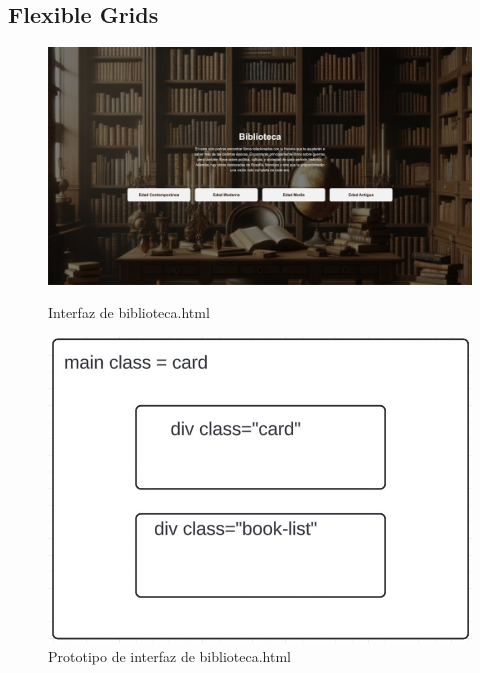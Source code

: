 \documentclass{article}
\begin{document}
\subsection{Flexible Grids}

\begin{figure}[H]
    \centering
    \begin{minipage}{0.49\textwidth}
        \includegraphics[width=\linewidth]{cssFotos/flexibleGrids.jpg}
        \caption{Interfaz de biblioteca.html}
        \label{fig:foro_interface}
    \end{minipage}\hfill
    \begin{minipage}{0.49\textwidth}
        \includegraphics[width=\linewidth]{cssFotos/flexibleGridsEsquema.jpg}
        \caption{Prototipo de interfaz de biblioteca.html}
        \label{fig:prototipo_foro}
    \end{minipage}
\end{figure}
\end{document}
